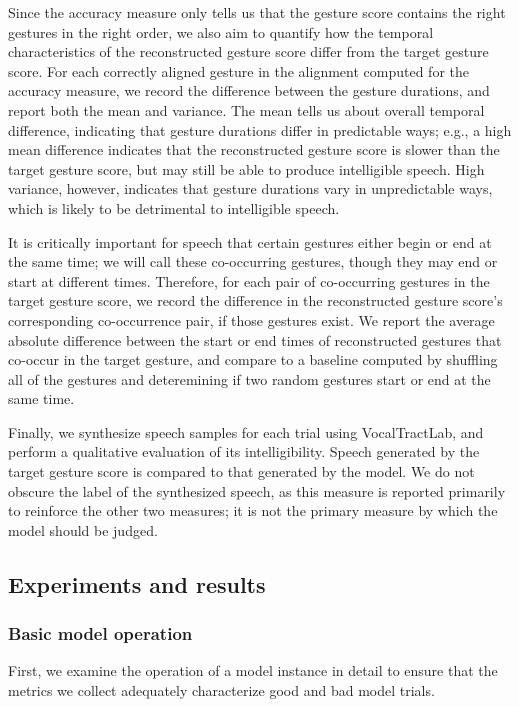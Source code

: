 Since the accuracy measure only tells us
that the gesture score contains
the right gestures in the right order,
we also aim to quantify
how the temporal characteristics
of the reconstructed gesture score
differ from the target gesture score.
For each correctly aligned gesture
in the alignment computed
for the accuracy measure,
we record the difference
between the gesture durations,
and report both the mean and variance.
The mean tells us about
overall temporal difference,
indicating that gesture durations
differ in predictable ways;
e.g., a high mean difference
indicates that
the reconstructed gesture score
is slower than the target gesture score,
but may still be able to
produce intelligible speech.
High variance, however,
indicates that
gesture durations vary in unpredictable ways,
which is likely to be detrimental
to intelligible speech.

It is critically important
for speech that certain gestures
either begin or end at the same time;
we will call these co-occurring gestures,
though they may end or start at different times.
Therefore, for each pair
of co-occurring gestures in the
target gesture score,
we record the difference
in the reconstructed gesture score's
corresponding co-occurrence pair,
if those gestures exist.
We report the average absolute
difference between the start or end times
of reconstructed gestures
that co-occur in the target gesture,
and compare to a baseline
computed by shuffling all of the gestures
and deteremining if two random gestures
start or end at the same time.

Finally, we synthesize speech samples
for each trial using VocalTractLab,
and perform a qualitative evaluation
of its intelligibility.
Speech generated by the
target gesture score is compared
to that generated by the model.
We do not obscure the label
of the synthesized speech,
as this measure is reported primarily
to reinforce the other two measures;
it is not the primary measure
by which the model should be judged.

\subsection{Experiments and results}
\label{sec:prod-results}

\subsubsection{Basic model operation}

First, we examine the operation
of a model instance in detail
to ensure that the metrics we collect
adequately characterize
good and bad model trials.

